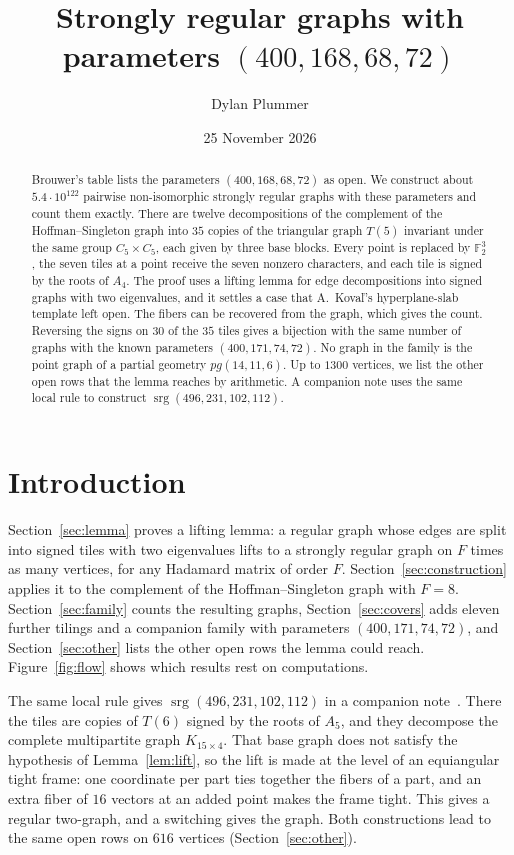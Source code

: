 \documentclass[11pt]{amsart}
\title[Strongly regular graphs on 400 vertices]{Strongly regular graphs with parameters $(400,168,68,72)$}
\author{Dylan Plummer}
\date{25 November 2026}
\theoremstyle{remark}
\newcommand{\F}{\mathbb{F}}
\DeclareMathOperator{\srg}{srg}
\begin{document}
\begin{abstract}
Brouwer's table lists the parameters $(400,168,68,72)$ as open. We construct about $5.4\cdot10^{122}$ pairwise non-isomorphic strongly regular graphs with these parameters and count them exactly. There are twelve decompositions of the complement of the Hoffman--Singleton graph into $35$ copies of the triangular graph $T(5)$ invariant under the same group $C_5\times C_5$, each given by three base blocks. Every point is replaced by $\F_2^3$, the seven tiles at a point receive the seven nonzero characters, and each tile is signed by the roots of $A_4$. The proof uses a lifting lemma for edge decompositions into signed graphs with two eigenvalues, and it settles a case that A.~Kova\v{l}'s hyperplane-slab template left open. The fibers can be recovered from the graph, which gives the count. Reversing the signs on $30$ of the $35$ tiles gives a bijection with the same number of graphs with the known parameters $(400,171,74,72)$. No graph in the family is the point graph of a partial geometry $pg(14,11,6)$. Up to $1300$ vertices, we list the other open rows that the lemma reaches by arithmetic. A companion note uses the same local rule to construct $\srg(496,231,102,112)$.
\end{abstract}

\maketitle

\section{Introduction}

Section~\ref{sec:lemma} proves a lifting lemma: a regular graph whose edges are split into signed tiles with two eigenvalues lifts to a strongly regular graph on $F$ times as many vertices, for any Hadamard matrix of order $F$. Section~\ref{sec:construction} applies it to the complement of the Hoffman--Singleton graph with $F=8$. Section~\ref{sec:family} counts the resulting graphs, Section~\ref{sec:covers} adds eleven further tilings and a companion family with parameters $(400,171,74,72)$, and Section~\ref{sec:other} lists the other open rows the lemma could reach. Figure~\ref{fig:flow} shows which results rest on computations.

The same local rule gives $\srg(496,231,102,112)$ in a companion note~\cite{P496}. There the tiles are copies of $T(6)$ signed by the roots of $A_5$, and they decompose the complete multipartite graph $K_{15\times4}$. That base graph does not satisfy the hypothesis of Lemma~\ref{lem:lift}, so the lift is made at the level of an equiangular tight frame: one coordinate per part ties together the fibers of a part, and an extra fiber of $16$ vectors at an added point makes the frame tight. This gives a regular two-graph, and a switching gives the graph. Both constructions lead to the same open rows on $616$ vertices (Section~\ref{sec:other}).
\end{document}
